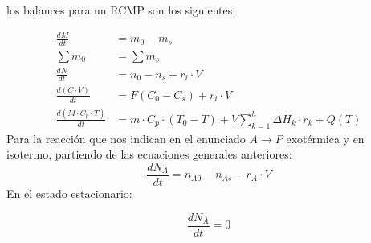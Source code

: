 \solve{}
\noindent los balances para un RCMP son los siguientes:


\begin{align*}
	\frac{dM}{dt}                     & = m_0 - m_s                                                                  \\[6pt]
	\sum m_0                          & = \sum m_s                                                                   \\[6pt]
	\frac{dN}{dt}                     & = n_0 - n_s + r_i \cdot V                                                    \\[6pt]
	\frac{d(C \cdot V)}{dt}           & = F(C_0 - C_s) + r_i \cdot V                                                 \\[6pt]
	\frac{d(M \cdot C_p \cdot T)}{dt} & = m \cdot C_p \cdot (T_0 - T) + V \sum_{k=1}^{h} \Delta H_k \cdot r_k + Q(T)
\end{align*}
\noindent Para la reacción que nos indican en el enunciado $A \rightarrow P$ exotérmica y en isotermo, partiendo de las ecuaciones generales anteriores:
\begin{equation*}
	\frac{dN_A}{dt} = n_{A0} - n_{As} - r_A \cdot V
\end{equation*}
\noindent En el estado estacionario:

\begin{equation*}
	\frac{dN_A}{dt} = 0
\end{equation*}

